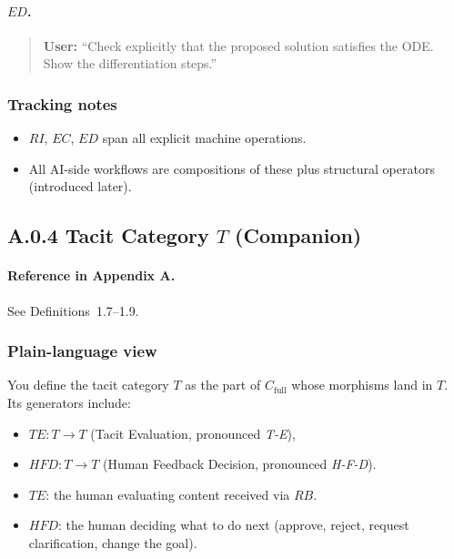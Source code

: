 \paragraph{$ED$.}
\begin{quote}
\textbf{User:} 
``Check explicitly that the proposed solution satisfies the ODE. Show the differentiation steps.'' 
\end{quote}

\subsubsection*{Tracking notes}

\begin{itemize}
 \item $RI$, $EC$, $ED$ span all explicit machine operations.
 \item All AI-side workflows are compositions of these plus structural operators (introduced later).
\end{itemize}

\newpage

\subsection{A.0.4 Tacit Category $T$ (Companion)}

\paragraph{Reference in Appendix A.}
See Definitions~1.7--1.9.

\subsubsection*{Plain-language view}

You define the tacit category $T$ as the part of $C_{\text{full}}$ whose morphisms land in $T$.
Its generators include:

\begin{itemize}
 \item $TE : T \to T$ (Tacit Evaluation, pronounced \emph{T-E}),
 \item $HFD : T \to T$ (Human Feedback Decision, pronounced \emph{H-F-D}).
\end{itemize}

\begin{itemize}
 \item $TE$: the human evaluating content received via $RB$.
 \item $HFD$: the human deciding what to do next (approve, reject, request clarification, change the
 goal).
\end{itemize}

